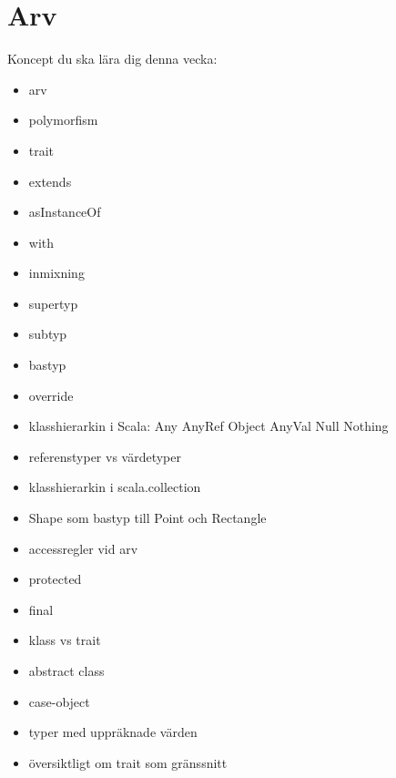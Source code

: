 \chapter{Arv}\label{chapter:W07}
Koncept du ska lära dig denna vecka:
\begin{multicols}{2}\begin{itemize}[nosep,label={$\square$},leftmargin=*]
\item arv
\item polymorfism
\item trait
\item extends
\item asInstanceOf
\item with
\item inmixning
\item supertyp
\item subtyp
\item bastyp
\item override
\item klasshierarkin i Scala: Any AnyRef Object AnyVal Null Nothing
\item referenstyper vs värdetyper
\item klasshierarkin i scala.collection
\item Shape som bastyp till Point och Rectangle
\item accessregler vid arv
\item protected
\item final
\item klass vs trait
\item abstract class
\item case-object
\item typer med uppräknade värden
\item översiktligt om trait som gränssnitt\end{itemize}\end{multicols}
